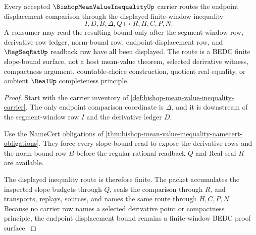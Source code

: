\begin{theorem}
\label{thm:bishop-mean-value-inequality-finite-slope-bound}
Every accepted $\BishopMeanValueInequalityUp$ carrier routes the endpoint displacement comparison through the displayed finite-window inequality
$$
I,D,B,\Delta,Q \longmapsto R,H,C,P,N .
$$
A consumer may read the resulting bound only after the segment-window row, derivative-row ledger, norm-bound row, endpoint-displacement row, and $\RegSeqRatUp$ readback row have all been displayed. The route is a BEDC finite slope-bound surface, not a host mean-value theorem, selected derivative witness, compactness argument, countable-choice construction, quotient real equality, or ambient $\RealUp$ completeness principle.
\end{theorem}
\begin{proof}
Start with the carrier inventory of \autoref{def:bishop-mean-value-inequality-carrier}. The only endpoint comparison coordinate is $\Delta$, and it is downstream of the segment-window row $I$ and the derivative ledger $D$.

Use the NameCert obligations of \autoref{thm:bishop-mean-value-inequality-namecert-obligations}. They force every slope-bound read to expose the derivative rows and the norm-bound row $B$ before the regular rational readback $Q$ and Real seal $R$ are available.

The displayed inequality route is therefore finite. The packet accumulates the inspected slope budgets through $Q$, seals the comparison through $R$, and transports, replays, sources, and names the same route through $H,C,P,N$. Because no carrier row names a selected derivative point or compactness principle, the endpoint displacement bound remains a finite-window BEDC proof surface.
\end{proof}




